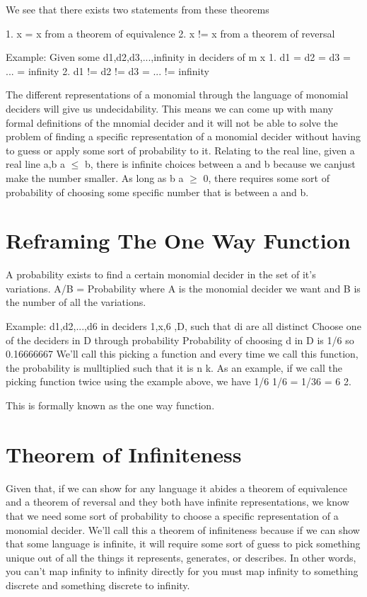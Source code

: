 We see that there exists two statements from these theorems

1. x = x from a theorem of equivalence
2. x != x from a theorem of reversal


Example:
Given some d1,d2,d3,...,infinity in deciders of m x
1. d1 = d2 = d3 = ... = infinity
2. d1 != d2 != d3 = ... != infinity

The different representations of a monomial through the language of monomial deciders will give us undecidability. This means we can come up with many formal definitions of the mnomial decider and it will not be able to solve the problem of finding a specific representation of a monomial decider without having to guess or apply some sort of probability to it. Relating to the real line, given a real line a,b a $\leq$ b, there is infinite choices between a and b because we canjust make the number smaller. As long as b  a $\geq $ 0, there requires some sort of probability of choosing some specific number that is between a and b.

\section{Reframing The One Way Function}

A probability exists to find a certain monomial decider in the set of it's variations. A/B = Probability where A is the monomial decider we want and B is the number of all the variations.

Example:
d1,d2,...,d6 in deciders 1,x,6 ,D, such that di are all distinct
Choose one of the deciders in D through probability
Probability of choosing d in D is 1/6 so 0.16666667
We'll call this picking a function and every time we call this function, the probability is mulltiplied such that it is n k. As an example, if we call the picking function twice using the example above, we have 1/6 1/6 = 1/36 = 6 2.

This is formally known as the one way function.

\section{Theorem of Infiniteness}

Given that, if we can show for any language it abides a theorem of equivalence and a theorem of reversal and they both have infinite representations, we know that we need some sort of probability to choose a specific representation of a monomial decider. We'll call this a theorem of infiniteness because if we can show that some language is infinite, it will require some sort of guess to pick something unique out of all the things it represents, generates, or describes. In other words, you can't map infinity to infinity directly for you must map infinity to something discrete and something discrete to infinity.

